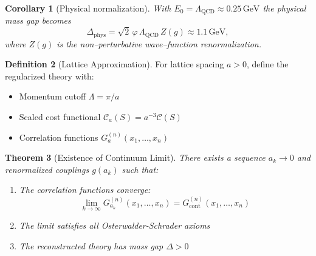 \documentclass[11pt]{article}
\numberwithin{equation}{section}
\newtheorem{theorem}{Theorem}[section]
\newtheorem{corollary}[theorem]{Corollary}
\theoremstyle{definition}
\newtheorem{definition}[theorem]{Definition}
\theoremstyle{remark}
\begin{document}
\begin{corollary}[Physical normalization]
With $E_0 = \Lambda_{\text{QCD}} \approx 0.25\,\text{GeV}$ the physical mass gap becomes
\[
\Delta_{\text{phys}} = \sqrt{2}\,\varphi\,\Lambda_{\text{QCD}}\, Z(g) \approx 1.1\,\text{GeV},
\]
where $Z(g)$ is the non--perturbative wave--function renormalization.
\end{corollary}

\begin{definition}[Lattice Approximation]
For lattice spacing $a > 0$, define the regularized theory with:
\begin{itemize}
\item Momentum cutoff $\Lambda = \pi/a$
\item Scaled cost functional $\mathcal{C}_a(S) = a^{-3} \mathcal{C}(S)$
\item Correlation functions $G_a^{(n)}(x_1,\ldots,x_n)$
\end{itemize}
\end{definition}

\begin{theorem}[Existence of Continuum Limit]
\label{thm:continuum}
There exists a sequence $a_k \to 0$ and renormalized couplings $g(a_k)$ such that:
\begin{enumerate}
\item The correlation functions converge:
\begin{equation}
\lim_{k \to \infty} G_{a_k}^{(n)}(x_1,\ldots,x_n) = G^{(n)}_{\text{cont}}(x_1,\ldots,x_n)
\end{equation}
\item The limit satisfies all Osterwalder-Schrader axioms
\item The reconstructed theory has mass gap $\Delta > 0$
\end{enumerate}
\end{theorem}
\end{document}
